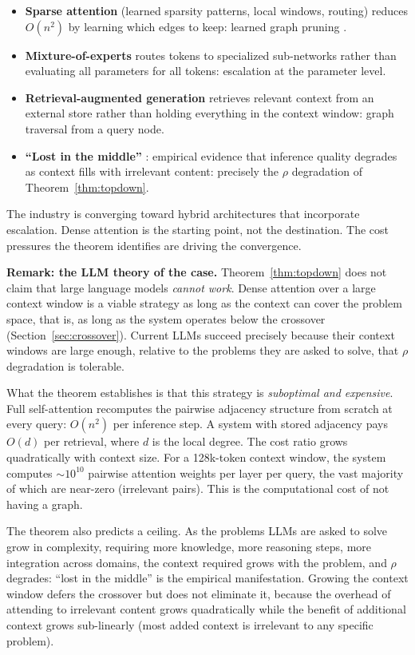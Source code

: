 \documentclass[11pt]{article}
\theoremstyle{definition}
\begin{document}
\begin{itemize}
\item \textbf{Sparse attention} (learned sparsity patterns, local
   windows, routing) reduces $O(n^2)$ by learning which edges to
   keep: learned graph pruning \cite{McCarthy2026a}.
\item \textbf{Mixture-of-experts} routes tokens to specialized
   sub-networks rather than evaluating all parameters for all tokens:
   escalation at the parameter level.
\item \textbf{Retrieval-augmented generation} retrieves relevant context
   from an external store rather than holding everything in the context
   window: graph traversal from a query node.
\item \textbf{``Lost in the middle''} \cite{Liu2024}: empirical evidence
   that inference quality degrades as context fills with irrelevant
   content: precisely the $\rho$ degradation of
   Theorem~\ref{thm:topdown}.
\end{itemize}

The industry is converging toward hybrid architectures that incorporate
escalation. Dense attention is the starting point, not the destination.
The cost pressures the theorem identifies are driving the convergence.

\textbf{Remark: the LLM theory of the case.}
Theorem~\ref{thm:topdown} does not claim that large language models
\emph{cannot work}. Dense attention over a large context window is a
viable strategy as long as the context can cover the problem space,
that is, as long as the system operates below the crossover
(Section~\ref{sec:crossover}). Current LLMs succeed precisely because
their context windows are large enough, relative to the problems they
are asked to solve, that $\rho$ degradation is tolerable.

What the theorem establishes is that this strategy is
\emph{suboptimal and expensive}. Full self-attention recomputes the
pairwise adjacency structure from scratch at every query: $O(n^2)$ per
inference step. A system with stored adjacency pays $O(d)$ per
retrieval, where $d$ is the local degree. The cost ratio grows
quadratically with context size. For a 128k-token context window, the
system computes ${\sim}10^{10}$ pairwise attention weights per layer per
query, the vast majority of which are near-zero (irrelevant pairs). This
is the computational cost of not having a graph.

The theorem also predicts a ceiling. As the problems LLMs are asked to
solve grow in complexity, requiring more knowledge, more reasoning
steps, more integration across domains, the context required grows
with the problem, and $\rho$ degrades: ``lost in the middle''
\cite{Liu2024} is the empirical manifestation. Growing the context
window defers the crossover but does not eliminate it, because the
overhead of attending to irrelevant content grows quadratically while
the benefit of additional context grows sub-linearly (most added context
is irrelevant to any specific problem).
\end{document}
